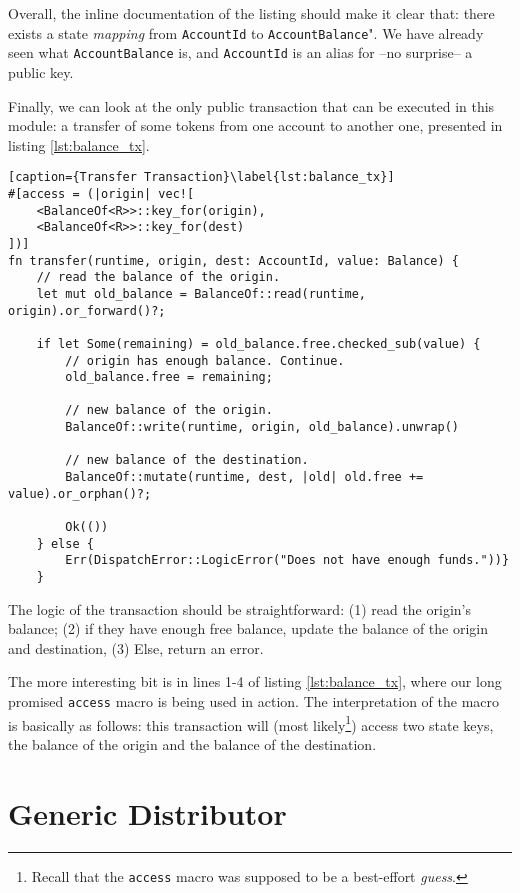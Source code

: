 Overall, the inline documentation of the listing should make it clear that: there exists a state
\textit{mapping} from \texttt{AccountId} to \texttt{AccountBalance}". We have already seen what
\texttt{AccountBalance} is, and \texttt{AccountId} is an alias for --no surprise-- a public key.

Finally, we can look at the only public transaction that can be executed in this module: a transfer
of some tokens from one account to another one, presented in listing \ref{lst:balance_tx}.

\begin{lstlisting}[caption={Transfer Transaction}\label{lst:balance_tx}]
#[access = (|origin| vec![
    <BalanceOf<R>>::key_for(origin),
    <BalanceOf<R>>::key_for(dest)
])]
fn transfer(runtime, origin, dest: AccountId, value: Balance) {
    // read the balance of the origin.
    let mut old_balance = BalanceOf::read(runtime, origin).or_forward()?;

    if let Some(remaining) = old_balance.free.checked_sub(value) {
        // origin has enough balance. Continue.
        old_balance.free = remaining;

        // new balance of the origin.
        BalanceOf::write(runtime, origin, old_balance).unwrap()

        // new balance of the destination.
        BalanceOf::mutate(runtime, dest, |old| old.free += value).or_orphan()?;

        Ok(())
    } else {
        Err(DispatchError::LogicError("Does not have enough funds."))}
    }
\end{lstlisting}

The logic of the transaction should be straightforward: (1) read the origin's balance; (2) if they
have enough free balance, update the balance of the origin and destination, (3) Else, return an
error.

The more interesting bit is in lines 1-4 of listing \ref{lst:balance_tx}, where our long
promised \texttt{access} macro is being used in action. The interpretation of the macro is basically
as follows: this transaction will (most likely\footnote{Recall that the \texttt{access} macro was
supposed to be a best-effort \textit{guess}.}) access two state keys, the balance of the origin and
the balance of the destination.

\section{Generic Distributor}

